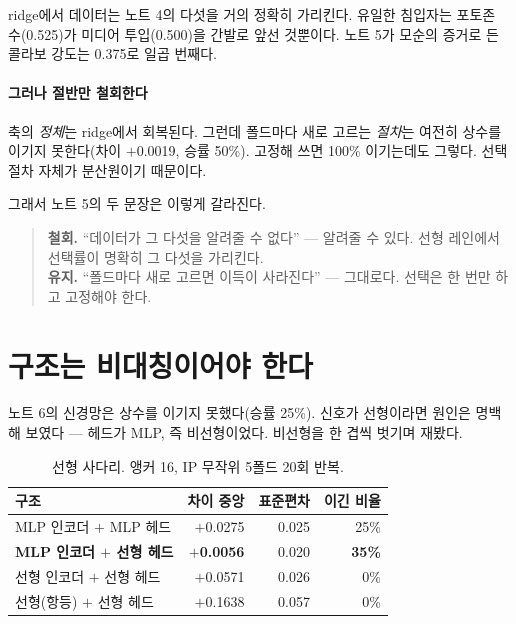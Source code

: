 \documentclass[10pt]{article}
\begin{document}
ridge에서 데이터는 노트 4의 다섯을 거의 정확히 가리킨다. 유일한 침입자는 포토존
수(0.525)가 미디어 투입(0.500)을 간발로 앞선 것뿐이다. 노트 5가 모순의 증거로 든
콜라보 강도는 0.375로 일곱 번째다.

\paragraph{그러나 절반만 철회한다}
축의 \emph{정체}는 ridge에서 회복된다. 그런데 폴드마다 새로 고르는 \emph{절차}는
여전히 상수를 이기지 못한다(차이 $+$0.0019, 승률 50\%). 고정해 쓰면 100\%
이기는데도 그렇다. 선택 절차 자체가 분산원이기 때문이다.

그래서 노트 5의 두 문장은 이렇게 갈라진다.

\begin{quote}\fontsize{9.2}{11}\selectfont
\textbf{철회.} ``데이터가 그 다섯을 알려줄 수 없다'' --- 알려줄 수 있다. 선형
레인에서 선택률이 명확히 그 다섯을 가리킨다.\\[0.35em]
\textbf{유지.} ``폴드마다 새로 고르면 이득이 사라진다'' --- 그대로다. 선택은
한 번만 하고 고정해야 한다.
\end{quote}


\section{구조는 비대칭이어야 한다}

노트 6의 신경망은 상수를 이기지 못했다(승률 25\%). 신호가 선형이라면 원인은 명백해
보였다 --- 헤드가 MLP, 즉 비선형이었다. 비선형을 한 겹씩 벗기며 재봤다.

\begin{table}[t]
\centering\tsize
\caption{선형 사다리. 앵커 16, IP 무작위 5폴드 20회 반복.}
\begin{tabular}{lrrr}
\toprule
구조 & 차이 중앙 & 표준편차 & 이긴 비율 \\
\midrule
MLP 인코더 $+$ MLP 헤드   & $+$0.0275 & 0.025 & 25\% \\
\textbf{MLP 인코더 $+$ 선형 헤드} & \textbf{$+$0.0056} & 0.020 & \textbf{35\%} \\
선형 인코더 $+$ 선형 헤드  & $+$0.0571 & 0.026 & 0\% \\
선형(항등) $+$ 선형 헤드   & $+$0.1638 & 0.057 & 0\% \\
\bottomrule
\end{tabular}
\end{table}
\end{document}
